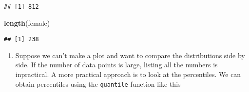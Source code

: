 \documentclass[
]{article}
\newenvironment{Shaded}{\begin{snugshade}}{\end{snugshade}}
\newcommand{\DataTypeTok}[1]{\textcolor[rgb]{0.13,0.29,0.53}{#1}}
\newcommand{\DecValTok}[1]{\textcolor[rgb]{0.00,0.00,0.81}{#1}}
\newcommand{\FloatTok}[1]{\textcolor[rgb]{0.00,0.00,0.81}{#1}}
\newcommand{\KeywordTok}[1]{\textcolor[rgb]{0.13,0.29,0.53}{\textbf{#1}}}
\newcommand{\NormalTok}[1]{#1}
\newcommand{\OperatorTok}[1]{\textcolor[rgb]{0.81,0.36,0.00}{\textbf{#1}}}
\newcommand{\StringTok}[1]{\textcolor[rgb]{0.31,0.60,0.02}{#1}}
\providecommand{\tightlist}{%
  \setlength{\itemsep}{0pt}\setlength{\parskip}{0pt}}
\begin{document}
\begin{verbatim}
## [1] 812
\end{verbatim}

\begin{Shaded}
\begin{Highlighting}[]
\KeywordTok{length}\NormalTok{(female)}
\end{Highlighting}
\end{Shaded}

\begin{verbatim}
## [1] 238
\end{verbatim}

\begin{enumerate}
\def\labelenumi{\arabic{enumi}.}
\setcounter{enumi}{1}
\tightlist
\item
  Suppose we can't make a plot and want to compare the distributions
  side by side. If the number of data points is large, listing all the
  numbers is inpractical. A more practical approach is to look at the
  percentiles. We can obtain percentiles using the \texttt{quantile}
  function like this
\end{enumerate}

\begin{Shaded}
\end{Shaded}

\begin{Shaded}
\end{Shaded}
\end{document}
